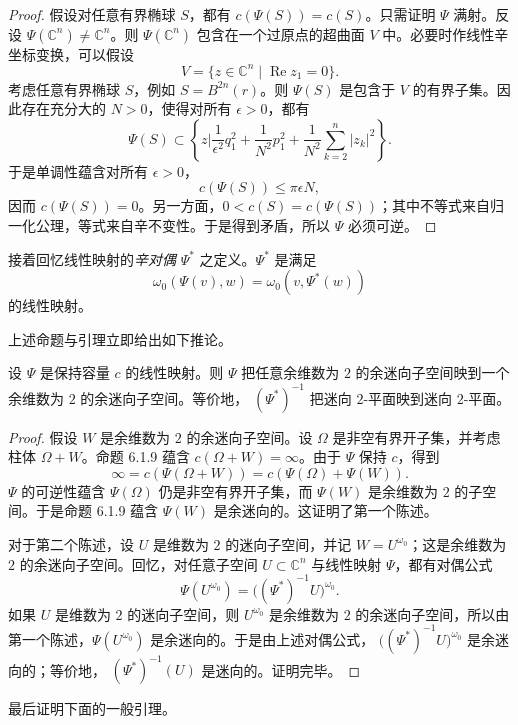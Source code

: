\begin{proof}
假设对任意有界椭球 $S$，都有 $c(\Psi(S))=c(S)$。只需证明
$\Psi$ 满射。反设 $\Psi(\mathbb C^n)\ne\mathbb C^n$。则
$\Psi(\mathbb C^n)$ 包含在一个过原点的超曲面 $V$ 中。必要时作线性辛坐标变换，可以假设
\[
 V=\{z\in\mathbb C^n\mid\operatorname{Re}z_1=0\}.
\]
考虑任意有界椭球 $S$，例如 $S=B^{2n}(r)$。则 $\Psi(S)$ 是包含于
$V$ 的有界子集。因此存在充分大的 $N>0$，使得对所有
$\epsilon>0$，都有
\[
 \Psi(S)\subset
 \left\{z\mathrel{\bigg|}
   \frac1{\epsilon^2}q_1^2+\frac1{N^2}p_1^2
   +\frac1{N^2}\sum_{k=2}^n|z_k|^2\right\}.
\]
于是单调性蕴含对所有 $\epsilon>0$，
\[
 c(\Psi(S))\leq\pi\epsilon N,
\]
因而 $c(\Psi(S))=0$。另一方面，$0<c(S)=c(\Psi(S))$；其中不等式来自归一化公理，等式来自辛不变性。于是得到矛盾，所以 $\Psi$ 必须可逆。
\end{proof}

接着回忆线性映射的\emph{辛对偶} $\Psi^*$ 之定义。$\Psi^*$ 是满足
\[
 \omega_0(\Psi(v),w)=\omega_0(v,\Psi^*(w))
\]
的线性映射。

上述命题与引理立即给出如下推论。

\begin{corollary}\label{cor:capacity-map-coisotropic-planes}
设 $\Psi$ 是保持容量 $c$ 的线性映射。则 $\Psi$ 把任意余维数为
$2$ 的余迷向子空间映到一个余维数为 $2$ 的余迷向子空间。等价地，
$(\Psi^*)^{-1}$ 把迷向 $2$-平面映到迷向 $2$-平面。
\end{corollary}

\begin{proof}
假设 $W$ 是余维数为 $2$ 的余迷向子空间。设 $\Omega$ 是非空有界开子集，并考虑柱体 $\Omega+W$。命题 6.1.9 蕴含
$c(\Omega+W)=\infty$。由于 $\Psi$ 保持 $c$，得到
\[
 \infty=c(\Psi(\Omega+W))=c(\Psi(\Omega)+\Psi(W)).
\]
$\Psi$ 的可逆性蕴含 $\Psi(\Omega)$ 仍是非空有界开子集，而
$\Psi(W)$ 是余维数为 $2$ 的子空间。于是命题 6.1.9 蕴含
$\Psi(W)$ 是余迷向的。这证明了第一个陈述。

对于第二个陈述，设 $U$ 是维数为 $2$ 的迷向子空间，并记
$W=U^{\omega_0}$；这是余维数为 $2$ 的余迷向子空间。回忆，对任意子空间 $U\subset\mathbb C^n$ 与线性映射 $\Psi$，都有对偶公式
\[
 \Psi(U^{\omega_0})
 =\bigl((\Psi^*)^{-1}U\bigr)^{\omega_0}.
\]
如果 $U$ 是维数为 $2$ 的迷向子空间，则 $U^{\omega_0}$ 是余维数为
$2$ 的余迷向子空间，所以由第一个陈述，$\Psi(U^{\omega_0})$ 是余迷向的。于是由上述对偶公式，
$\bigl((\Psi^*)^{-1}U\bigr)^{\omega_0}$ 是余迷向的；等价地，
$(\Psi^*)^{-1}(U)$ 是迷向的。证明完毕。
\end{proof}

最后证明下面的一般引理。

